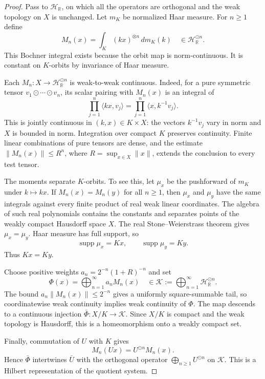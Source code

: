 \documentclass[11pt]{article}
\newcommand{\R}{\mathbb R}
\newcommand{\Hh}{\mathcal H}
\newcommand{\dd}{\,d}
\begin{document}
\begin{proof}
Pass to $\Hh_{\R}$, on which all the operators are orthogonal and the weak
topology on $X$ is unchanged.  Let $m_K$ be normalized Haar measure.  For
$n\geq1$ define
\[
 M_n(x)=\int_K (kx)^{\otimes n}\dd m_K(k)
 \quad\in\Hh_{\R}^{\odot n}.
\]
This Bochner integral exists because the orbit map is norm-continuous.  It is
constant on $K$-orbits by invariance of Haar measure.

Each $M_n:X\to\Hh_{\R}^{\odot n}$ is weak-to-weak continuous.  Indeed, for a
pure symmetric tensor $v_1\odot\cdots\odot v_n$, its scalar pairing with
$M_n(x)$ is an integral of
\[
 \prod_{j=1}^n \langle kx,v_j\rangle
 =\prod_{j=1}^n \langle x,k^{-1}v_j\rangle.
\]
This is jointly continuous in $(k,x)\in K\times X$: the vectors $k^{-1}v_j$
vary in norm and $X$ is bounded in norm.  Integration over compact $K$
preserves continuity.  Finite linear combinations of pure tensors are dense,
and the estimate $\|M_n(x)\|\leq R^n$, where
$R=\sup_{x\in X}\|x\|$, extends the conclusion to every test tensor.

The moments separate $K$-orbits.  To see this, let $\mu_x$ be the pushforward
of $m_K$ under $k\mapsto kx$.  If $M_n(x)=M_n(y)$ for all $n\geq1$, then
$\mu_x$ and $\mu_y$ have the same integrals against every finite product of
real weak linear coordinates.  The algebra of such real polynomials contains
the constants and separates points of the weakly compact Hausdorff space
$X$.  The real Stone--Weierstrass theorem \cite{Rudin} gives
$\mu_x=\mu_y$.  Haar measure has full support, so
\[
 \operatorname{supp}\mu_x=Kx,\qquad
 \operatorname{supp}\mu_y=Ky.
\]
Thus $Kx=Ky$.

Choose positive weights
$a_n=2^{-n}(1+R)^{-n}$ and set
\[
 \Phi(x)=\bigoplus_{n=1}^{\infty}a_nM_n(x)
 \quad\in\mathcal K:=\bigoplus_{n=1}^{\infty}\Hh_{\R}^{\odot n}.
\]
The bound $a_n\|M_n(x)\|\leq2^{-n}$ gives a uniformly square-summable tail,
so coordinatewise weak continuity implies weak continuity of $\Phi$.  The map
descends to a continuous injection $\bar\Phi:X/K\to\mathcal K$.  Since $X/K$
is compact and the weak topology is Hausdorff, this is a homeomorphism onto a
weakly compact set.

Finally, commutation of $U$ with $K$ gives
\[
 M_n(Ux)=U^{\odot n}M_n(x).
\]
Hence $\bar\Phi$ intertwines $\bar U$ with the orthogonal operator
$\bigoplus_{n\geq1}U^{\odot n}$ on $\mathcal K$.  This is a Hilbert
representation of the quotient system.
\end{proof}
\end{document}
